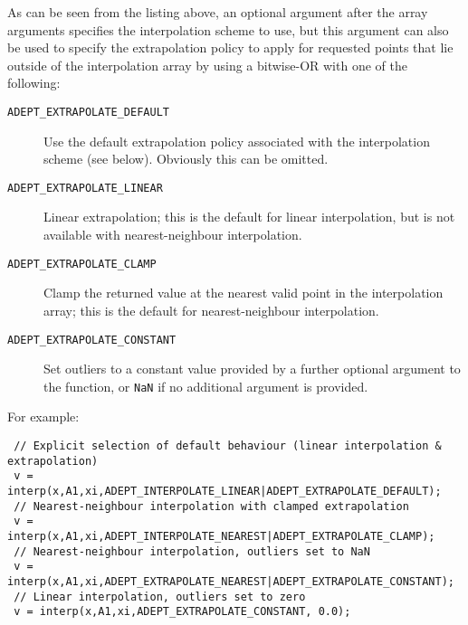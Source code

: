 \documentclass[a4,oneside]{book}
\def\codesize{\small}
\def\code#1{{\codesize\texttt{#1}}}
\def\citem#1{\item[{\codesize\texttt{#1}}]}
\begin{document}
As can be seen from the listing above, an optional argument after the
array arguments specifies the interpolation scheme to use, but this
argument can also be used to specify the extrapolation policy to apply
for requested points that lie outside of the interpolation array by
using a bitwise-OR with one of the following:
%
\begin{description}
  \citem{ADEPT\_EXTRAPOLATE\_DEFAULT} Use the default extrapolation
  policy associated with the interpolation scheme (see
  below). Obviously this can be omitted.
  \citem{ADEPT\_EXTRAPOLATE\_LINEAR} Linear extrapolation; this is the
  default for linear interpolation, but is not available with
  nearest-neighbour interpolation.  \citem{ADEPT\_EXTRAPOLATE\_CLAMP}
  Clamp the returned value at the nearest valid point in the
  interpolation array; this is the default for nearest-neighbour
  interpolation.  \citem{ADEPT\_EXTRAPOLATE\_CONSTANT} Set outliers to
  a constant value provided by a further optional argument to the
  function, or \code{NaN} if no additional argument is provided.
\end{description}
For example:
\begin{lstlisting}
 // Explicit selection of default behaviour (linear interpolation & extrapolation)
 v = interp(x,A1,xi,ADEPT_INTERPOLATE_LINEAR|ADEPT_EXTRAPOLATE_DEFAULT);
 // Nearest-neighbour interpolation with clamped extrapolation
 v = interp(x,A1,xi,ADEPT_INTERPOLATE_NEAREST|ADEPT_EXTRAPOLATE_CLAMP);
 // Nearest-neighbour interpolation, outliers set to NaN
 v = interp(x,A1,xi,ADEPT_EXTRAPOLATE_NEAREST|ADEPT_EXTRAPOLATE_CONSTANT);
 // Linear interpolation, outliers set to zero
 v = interp(x,A1,xi,ADEPT_EXTRAPOLATE_CONSTANT, 0.0);
\end{lstlisting}
\end{document}
